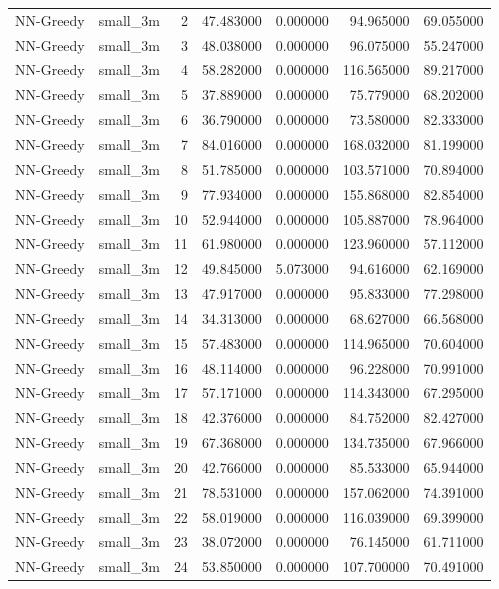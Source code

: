 \begin{tabular}{llrrrrr}
NN-Greedy & small_3m & 2 & 47.483000 & 0.000000 & 94.965000 & 69.055000 \\
NN-Greedy & small_3m & 3 & 48.038000 & 0.000000 & 96.075000 & 55.247000 \\
NN-Greedy & small_3m & 4 & 58.282000 & 0.000000 & 116.565000 & 89.217000 \\
NN-Greedy & small_3m & 5 & 37.889000 & 0.000000 & 75.779000 & 68.202000 \\
NN-Greedy & small_3m & 6 & 36.790000 & 0.000000 & 73.580000 & 82.333000 \\
NN-Greedy & small_3m & 7 & 84.016000 & 0.000000 & 168.032000 & 81.199000 \\
NN-Greedy & small_3m & 8 & 51.785000 & 0.000000 & 103.571000 & 70.894000 \\
NN-Greedy & small_3m & 9 & 77.934000 & 0.000000 & 155.868000 & 82.854000 \\
NN-Greedy & small_3m & 10 & 52.944000 & 0.000000 & 105.887000 & 78.964000 \\
NN-Greedy & small_3m & 11 & 61.980000 & 0.000000 & 123.960000 & 57.112000 \\
NN-Greedy & small_3m & 12 & 49.845000 & 5.073000 & 94.616000 & 62.169000 \\
NN-Greedy & small_3m & 13 & 47.917000 & 0.000000 & 95.833000 & 77.298000 \\
NN-Greedy & small_3m & 14 & 34.313000 & 0.000000 & 68.627000 & 66.568000 \\
NN-Greedy & small_3m & 15 & 57.483000 & 0.000000 & 114.965000 & 70.604000 \\
NN-Greedy & small_3m & 16 & 48.114000 & 0.000000 & 96.228000 & 70.991000 \\
NN-Greedy & small_3m & 17 & 57.171000 & 0.000000 & 114.343000 & 67.295000 \\
NN-Greedy & small_3m & 18 & 42.376000 & 0.000000 & 84.752000 & 82.427000 \\
NN-Greedy & small_3m & 19 & 67.368000 & 0.000000 & 134.735000 & 67.966000 \\
NN-Greedy & small_3m & 20 & 42.766000 & 0.000000 & 85.533000 & 65.944000 \\
NN-Greedy & small_3m & 21 & 78.531000 & 0.000000 & 157.062000 & 74.391000 \\
NN-Greedy & small_3m & 22 & 58.019000 & 0.000000 & 116.039000 & 69.399000 \\
NN-Greedy & small_3m & 23 & 38.072000 & 0.000000 & 76.145000 & 61.711000 \\
NN-Greedy & small_3m & 24 & 53.850000 & 0.000000 & 107.700000 & 70.491000 \\

\end{tabular}
